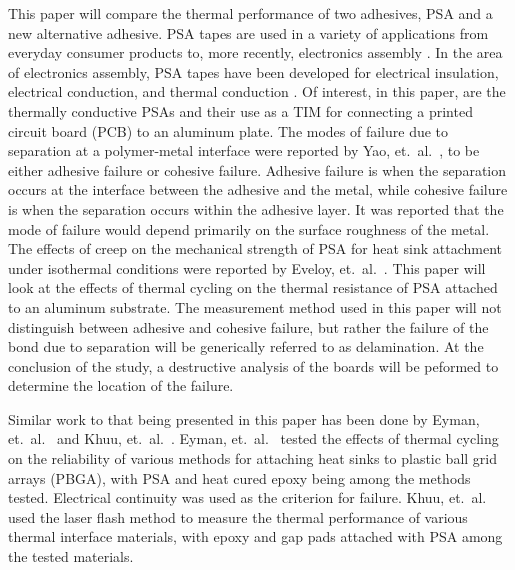 This paper will compare the thermal performance of two adhesives, PSA and a new alternative adhesive.  PSA tapes are used in a variety of applications from everyday consumer products to, more recently, electronics assembly \cite{Creton2003}.  In the area of electronics assembly, PSA tapes have been developed for electrical insulation, electrical conduction, and thermal conduction \cite{Conner1995,Klosterman1998}.  Of interest, in this paper, are the thermally conductive PSAs and their use as a TIM for connecting a printed circuit board (PCB) to an aluminum plate.  The modes of failure due to separation at a polymer-metal interface were reported by Yao, et.~al.~\cite{Yao2002}, to be either adhesive failure or cohesive failure.  Adhesive failure is when the separation occurs at the interface between the adhesive and the metal, while cohesive failure is when the separation occurs within the adhesive layer.  It was reported that the mode of failure would depend primarily on the surface roughness of the metal.  The effects of creep on the mechanical strength of PSA for heat sink attachment under isothermal conditions were reported by Eveloy, et.~al.~\cite{Eveloy2004}.  This paper will look at the effects of thermal cycling on the thermal resistance of PSA attached to an aluminum substrate.  The measurement method used in this paper will not distinguish between adhesive and cohesive failure, but rather the failure of the bond due to separation will be generically referred to as delamination.  At the conclusion of the study, a destructive analysis of the boards will be peformed to determine the location of the failure.

Similar work to that being presented in this paper has been done by Eyman, et.~al.~\cite{Eyman1997} and Khuu, et.~al.~\cite{Khuu2007}.  Eyman, et.~al.~\cite{Eyman1997} tested the effects of thermal cycling on the reliability of various methods for attaching heat sinks to plastic ball grid arrays (PBGA), with PSA and heat cured epoxy being among the methods tested.  Electrical continuity was used as the criterion for failure.  Khuu, et.~al.~\cite{Khuu2007} used the laser flash method to measure the thermal performance of various thermal interface materials, with epoxy and gap pads attached with PSA among the tested materials.  

